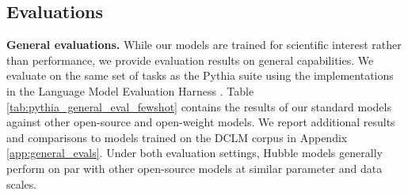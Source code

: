 \documentclass{article} %
\begin{document}
% 

\subsection{Evaluations} \label{sec:evaluations}


\textbf{General evaluations.} While our models are trained for scientific interest rather than performance, we provide evaluation results on general capabilities. We evaluate on the same set of tasks as the Pythia suite using the implementations in the Language Model Evaluation Harness \cite[lm-eval-harness;][]{eval-harness}. Table \ref{tab:pythia_general_eval_fewshot} contains the results of our standard models against other open-source and open-weight models. We report additional results and comparisons to models trained on the \textsc{DCLM} corpus in Appendix \ref{app:general_evals}. Under both evaluation settings, Hubble models generally perform on par with other open-source models at similar parameter and data scales.
\end{document}
